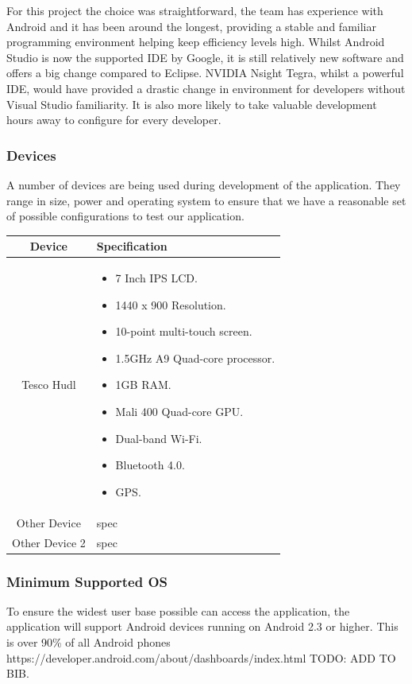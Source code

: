 \documentclass[11pt,a4paper]{article}
\begin{document}
For this project the choice was straightforward, the team has experience with Android and it has been around the longest, providing a stable and familiar programming environment helping keep efficiency levels high. Whilst Android Studio is now the supported IDE by Google, it is still relatively new software and offers a big change compared to Eclipse. NVIDIA Nsight Tegra, whilst a powerful IDE, would have provided a drastic change in environment for developers without Visual Studio familiarity. It is also more likely to take valuable development hours away to configure for every developer.

\subsubsection{Devices}
A number of devices are being used during development of the application. They range in size, power and operating system to ensure that we have a reasonable set of possible configurations to test our application.

\begin{longtable}{|c|p{8cm}|}\hline
\textbf{Device} & \textbf{Specification} \\ \hline
Tesco Hudl & \begin{itemize}
\item 7 Inch IPS LCD.
\item 1440 x 900 Resolution.
\item 10-point multi-touch screen.
\item 1.5GHz A9 Quad-core processor.
\item 1GB RAM.
\item Mali 400 Quad-core GPU.
\item Dual-band Wi-Fi.
\item Bluetooth 4.0.
\item GPS.
\end{itemize} \\ \hline
Other Device & spec \\ \hline
Other Device 2 & spec \\ \hline

\end{longtable}

\subsubsection{Minimum Supported OS}
To ensure the widest user base possible can access the application, the application will support Android devices running on Android 2.3 or higher. This is over 90\% of all Android phones https://developer.android.com/about/dashboards/index.html TODO: ADD TO BIB.
\end{document}
